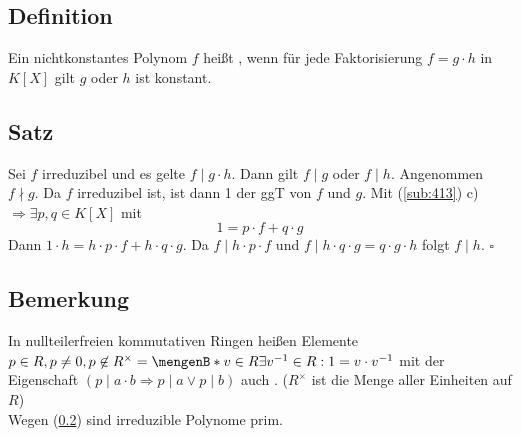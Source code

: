 \subsection[Definition irreduzibles Polynom]{Definition} %
\label{sub:415}
Ein nichtkonstantes Polynom $f$ heißt , wenn für jede Faktorisierung $f= g \cdot h$ in $K[X]$ gilt $g$ oder $h$ ist konstant.

\subsection[Satz, dass ein irreduzibles Polynom seine Faktoren teilt]{Satz} %
\label{sub:416}
Sei $f$ irreduzibel und es gelte $f\mid g \cdot h$. Dann gilt $f\mid g$ oder $f\mid h$.
Angenommen $f \nmid g$. Da $f$ irreduzibel ist, ist dann 1 der ggT von $f$ und $g$. Mit (\ref{sub:413}) c) $\Rightarrow  \exists p,q \in K[X]$ mit 
\[
	1 = p \cdot f + q \cdot g
\]
Dann $1 \cdot h= h \cdot p \cdot f + h \cdot q \cdot g$. Da $f\mid h \cdot p \cdot f$ und $f\mid h \cdot q \cdot g = q \cdot g \cdot h$ folgt $f\mid h$. 
\hfill \( \square \)

\subsection[Bemerkung Definition von prim und Einheit]{Bemerkung} %
\label{sub:417}
In nullteilerfreien kommutativen Ringen heißen Elemente $p \in R, p \not= 0, p \not\in R^\times = \set[v \in R]{\exists v ^{-1} \in R : 1 = v \cdot v ^{-1}} $ mit der
Eigenschaft $(p\mid a \cdot b \Rightarrow p\mid a \vee p\mid b)$ auch . 
($R^\times$ ist die Menge aller Einheiten auf $R$) \\
Wegen (\ref{sub:416}) sind irreduzible Polynome prim.

